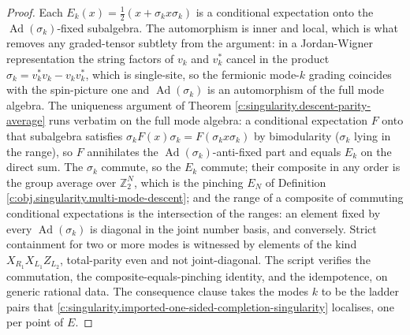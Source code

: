 \documentclass[11pt]{article}
\theoremstyle{definition}
\theoremstyle{plain}
\providecommand{\EN}{}\renewcommand{\EN}{E_{N}}
\begin{document}
\begin{proof}
Each $E_k(x) = \tfrac12(x + \sigma_k x \sigma_k)$ is a conditional expectation onto the $\operatorname{Ad}(\sigma_k)$-fixed subalgebra. The automorphism is inner and local, which is what removes any graded-tensor subtlety from the argument: in a Jordan-Wigner representation the string factors of $v_k$ and $v_k^{*}$ cancel in the product $\sigma_k = v_k^{*}v_k - v_k v_k^{*}$, which is single-site, so the fermionic mode-$k$ grading coincides with the spin-picture one and $\operatorname{Ad}(\sigma_k)$ is an automorphism of the full mode algebra. The uniqueness argument of Theorem \ref{c:singularity.descent-parity-average} runs verbatim on the full mode algebra: a conditional expectation $F$ onto that subalgebra satisfies $\sigma_k F(x)\sigma_k = F(\sigma_k x \sigma_k)$ by bimodularity ($\sigma_k$ lying in the range), so $F$ annihilates the $\operatorname{Ad}(\sigma_k)$-anti-fixed part and equals $E_k$ on the direct sum. The $\sigma_k$ commute, so the $E_k$ commute; their composite in any order is the group average over $\mathbb{Z}_2^{N}$, which is the pinching $\EN$ of Definition \ref{c:obj.singularity.multi-mode-descent}; and the range of a composite of commuting conditional expectations is the intersection of the ranges: an element fixed by every $\operatorname{Ad}(\sigma_k)$ is diagonal in the joint number basis, and conversely. Strict containment for two or more modes is witnessed by elements of the kind $X_{R_1}X_{L_1}Z_{L_2}$, total-parity even and not joint-diagonal. The script verifies the commutation, the composite-equals-pinching identity, and the idempotence, on generic rational data. The consequence clause takes the modes $k$ to be the ladder pairs that \ref{c:singularity.imported-one-sided-completion-singularity} localises, one per point of $E$.

\end{proof}
\end{document}

